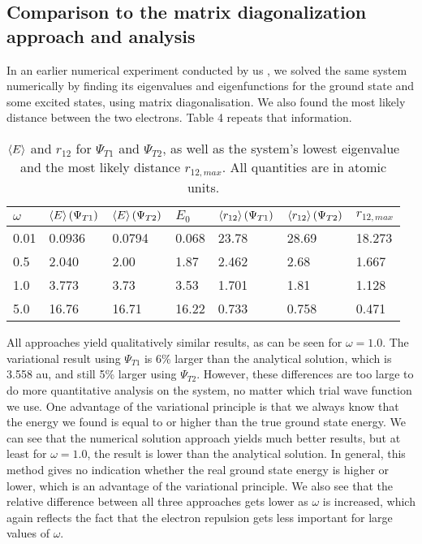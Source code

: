 \documentclass[10pt,a4paper]{article}
\begin{document}
\subsection{Comparison to the matrix diagonalization approach and analysis}
In an earlier numerical experiment conducted by us \cite{Project2}, we solved the same system numerically by finding its eigenvalues and eigenfunctions for the ground state and some excited states, using matrix diagonalisation. We also found the most likely distance between the two electrons. Table 4 repeats that information. 
\begin{table}[H]
\centering
\caption[Energies and distances compared to diagonalisation]{$\braket{E}$ and $r_{12}$ for $\Psi_{T1}$ and $\Psi_{T2}$, as well as the system's lowest eigenvalue and the most likely distance $r_{12,max}$. All quantities are in atomic units.}
\begin{tabular}{|l|l|l|l|l|l|l|}
\hline
$\omega$ & $\braket{E}(\Psi_{T1})$ & $\braket{E}(\Psi_{T2})$ & $E_0$ & $\braket{r_{12}}(\Psi_{T1})$ & $\braket{r_{12}}(\Psi_{T2})$ & $r_{12,max}$ \\ \hline
0.01     & 0.0936                 & 0.0794                  & 0.068 & 23.78                        & 28.69                        & 18.273    \\ \hline
0.5      & 2.040                  & 2.00                    & 1.87  & 2.462                        & 2.68                         & 1.667     \\ \hline
1.0      & 3.773                  & 3.73                    & 3.53  & 1.701                        & 1.81                         & 1.128     \\ \hline
5.0      & 16.76                  & 16.71                   & 16.22 & 0.733                        & 0.758                        & 0.471     \\ \hline
\end{tabular}
\end{table}
All approaches yield qualitatively similar results, as can be seen for $\omega=1.0$. The variational result using $\Psi_{T1}$ is 6\% larger than the analytical solution, which is 3.558 au, and still 5\% larger using $\Psi_{T2}$. However, these differences are too large to do more quantitative analysis on the system, no matter which trial wave function we use.  One advantage of the variational principle is that we always know that the energy we found is equal to or higher than the true ground state energy. We can see that the numerical solution approach yields much better results, but at least for $\omega=1.0$, the result is lower than the analytical solution. In general, this method gives no indication whether the real ground state energy is higher or lower, which is an advantage of the variational principle. We also see that the relative difference between all three approaches gets lower as $\omega$ is increased, which again reflects the fact that the electron repulsion gets less important for large values of $\omega$.\\
\end{document}
